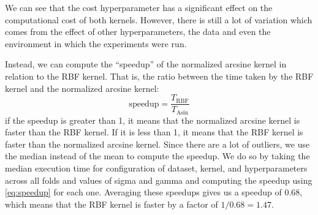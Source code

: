 We can see that the cost hyperparameter has a significant effect on the
computational cost of both kernels. However, there is still a lot of variation
which comes from the effect of other hyperparameters, the data and even the
environment in which the experiments were run.

Instead, we can compute the ``speedup'' of the normalized arcsine kernel
in relation to the RBF kernel. That is, the ratio between the time taken
by the RBF kernel and the normalized arcsine kernel:
\begin{equation}
    \text{speedup} = \frac{T_{\text{RBF}}}{T_{\text{Asin}}} \label{eq:speedup}
\end{equation}
if the speedup is greater than 1, it means that the normalized arcsine kernel
is faster than the RBF kernel. If it is less than 1, it means that the RBF
kernel is faster than the normalized arcsine kernel. Since there are a lot
of outliers, we use the median instead of the mean to compute the speedup. We
do so by taking the median execution time for configuration of dataset, kernel,
and hyperparameters across all folds and values of sigma and gamma and computing
the speedup using \cref{eq:speedup} for each one. Averaging these speedups
gives us a speedup of $0.68$, which means that the RBF kernel is faster by
a factor of $1/0.68 = 1.47$.


